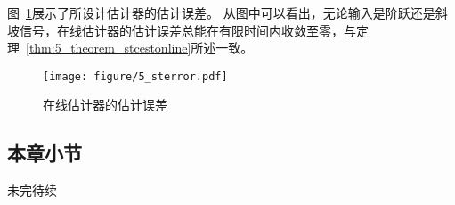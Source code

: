 \documentclass{article}
\begin{document}
图~\ref{fig:5_sterror}展示了所设计估计器的估计误差。
从图中可以看出，无论输入是阶跃还是斜坡信号，在线估计器的估计误差总能在有限时间内收敛至零，与定理~\ref{thm:5_theorem_stcestonline}所述一致。
\begin{figure}[!ht]
    \centering
    \texttt{[image: figure/5\_sterror.pdf]}
    \caption{在线估计器的估计误差}
    \label{fig:5_sterror}
\end{figure}

\subsection{本章小节}
未完待续



\end{document}

